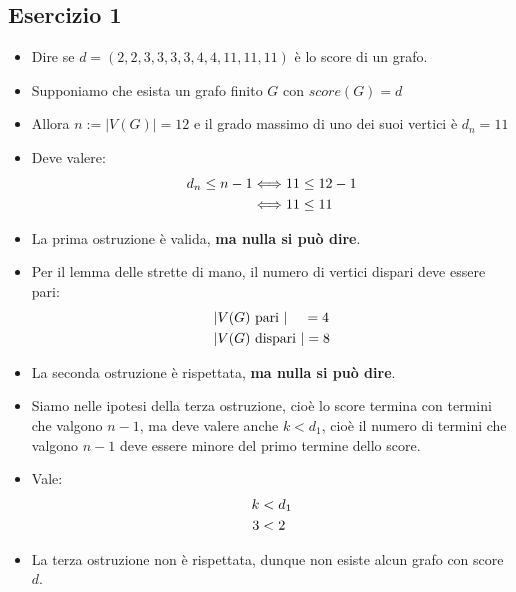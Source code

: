 \documentclass[10pt]{article}
\begin{document}
	\newpage
	
	\subsection{Esercizio 1}
	\begin{itemize}
	\item
	Dire se $d = (2,2,3,3,3,3,4,4,11,11,11)$ è lo score di un grafo.
	\item
	Supponiamo che esista un grafo finito $G$ con $score(G) = d$
	\item
	Allora $n := |V(G)| = 12$ e il grado massimo di uno dei suoi vertici è $d_n = 11$
	\item
	Deve valere:
	\begin{equation}
	\begin{split}
		d_n \leq n - 1 &\Longleftrightarrow 11 \leq 12 - 1  \\
		&\Longleftrightarrow 11 \leq 11
		\notag
		\end{split}
	\end{equation}
	\item
	La prima ostruzione è valida, \textbf{ma nulla si può dire}.
	\item
	Per il lemma delle strette di mano, il numero di vertici dispari deve essere pari:
	\begin{equation}
	\begin{split}
		|&V(G) \textrm{ pari }| \quad\, =  4\\
		|&V(G) \textrm{ dispari }| = 8 
		\notag
		\end{split}
	\end{equation}
	\item
	La seconda ostruzione è rispettata, \textbf{ma nulla si può dire}.
	\item
	Siamo nelle ipotesi della terza ostruzione, cioè lo score termina con termini che valgono $n-1$, ma deve valere anche $k < d_1$, cioè il numero di termini che valgono $n-1$ deve essere minore del primo termine dello score.
	\item
	Vale:
	\begin{equation}
	\begin{split}
		k &< d_1 \\
		3 &< 2
		\notag
		\end{split}
	\end{equation}
	\item
	La terza ostruzione non è rispettata, dunque non esiste alcun grafo con score $d$.
	\end{itemize}
	
\end{document}
